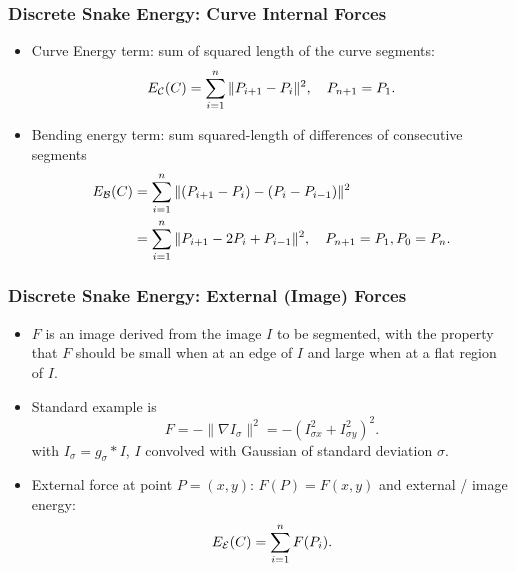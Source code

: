 \documentclass[10pt]{beamer}
\begin{document}
\begin{frame}
  \frametitle{Discrete Snake Energy: Curve Internal Forces}
  \begin{itemize}
  \item Curve Energy term: sum of squared length of the curve segments:
    $$
    E_{\mathcal C}(C) = \sum_{i=1}^n\|P_{i+1}-P_i\|^2,\quad P_{n+1} = P_1.
    $$
  \item Bending energy term: sum squared-length of  differences of consecutive segments
    \begin{align*}
      E_{\mathcal B}(C) &= \sum_{i=1}^n\| (P_{i+1}-P_i) - (P_i-P_{i-1})\|^2\\
      &=\sum_{i=1}^n\| P_{i+1}-2P_i+P_{i-1}\|^2,\quad P_{n+1} = P_1, P_0 = P_n.
    \end{align*}
  \end{itemize}
\end{frame}



\begin{frame}
   \frametitle{Discrete Snake Energy: External (Image) Forces}
   \begin{itemize}
   \item
     $F$ is an image derived from the image $I$ to be segmented, with the property that
     $F$ should be small when at an edge of $I$ and large when at a flat region of $I$. 
   \item Standard example is 
     $$
     F = -\|\nabla I_\sigma\|^2 = -\left(I_{\sigma x}^2 + I_{\sigma y}^2\right)^2.
     $$
     with $I_\sigma = g_\sigma\ast I$, $I$ convolved with Gaussian of standard deviation $\sigma$.
   \item External force at point $P = (x,y)$: $F(P) = F(x,y)$ and external / image energy:
     $$
     E_{\mathcal E}(C) = \sum_{i=1}^n F(P_i).
     $$
   \end{itemize}
 \end{frame}
\end{document}
